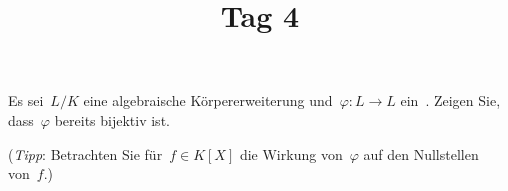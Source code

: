 \documentclass{scrartcl}
\title{Tag 4}
\author{}
\date{}
\begin{document}
\maketitle
\vspace{-6em}

\begin{exercise}
  Es sei~$L/K$ eine algebraische Körpererweiterung und~$\varphi \colon L \to L$ ein~.
  Zeigen Sie, dass~$\varphi$ bereits bijektiv ist.

  (\emph{Tipp}: Betrachten Sie für~$f \in K[X]$ die Wirkung von~$\varphi$ auf den Nullstellen von~$f$.)
\end{exercise}
\end{document}
